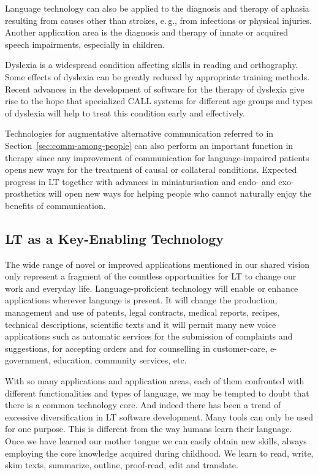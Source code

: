 \documentclass[10pt, plain]{../../metanetpaper}
\begin{document}
\begin{multicols}{2}
Language technology can also be applied to the diagnosis and therapy of aphasia resulting from causes other than strokes, e.\,g., from infections or physical injuries. Another application area is the diagnosis and therapy of innate or acquired speech impairments, especially in children. 
 
Dyslexia is a widespread condition affecting skills in reading and orthography. Some effects of dyslexia can be greatly reduced by appropriate training methods. Recent advances in the development of software for the therapy of dyslexia give rise to the hope that specialized CALL systems for different age groups and types of dyslexia will help to treat this condition early and effectively.
 
Technologies for augmentative alternative communication referred to in Section~\ref{sec:comm-among-people} can also perform an important function in therapy since any improvement of communication for language-impaired patients opens new ways for the treatment of causal or collateral conditions. Expected progress in LT together with advances in miniaturisation and endo- and exo-prosthetics will open new ways for helping people who cannot naturally enjoy the benefits of communication.

\subsection[Language Technology as a Key-Enabling Technology]{LT as a Key-Enabling Technology}
\label{sec:lang-techn-as-key-enabling-technology}

The wide range of novel or improved applications mentioned in our shared vision only represent a fragment of the countless opportunities for LT to change our work and everyday life. Language-proficient technology will enable or enhance applications wherever language is present. It will change the production, management and use of patents, legal contracts, medical reports, recipes, technical descriptions, scientific texts and it will permit many new voice applications such as automatic services for the submission of complaints and suggestions, for accepting orders and for counselling in customer-care, e-government, education, community services, etc.   

With so many applications and application areas, each of them confronted with different functionalities and types of language, we may be tempted to doubt that there is a common technology core. And indeed there has been a trend of excessive diversification in LT software development. Many tools can only be used for one purpose. This is different from the way humans learn their language. Once we have learned our mother tongue we can easily obtain new skills, always employing the core knowledge acquired during childhood. We learn to read, write, skim texts, summarize, outline, proof-read, edit and translate.
 

\end{multicols}
\end{document}
